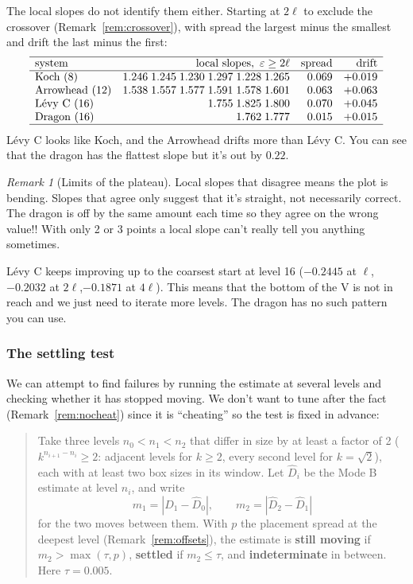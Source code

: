 \documentclass[11pt, a4paper]{article}
\theoremstyle{plain}
\theoremstyle{definition}
\theoremstyle{remark}
\newtheorem{remark}[theorem]{Remark}
\newcommand{\eps}{\varepsilon}
\begin{document}
The local slopes do not identify them either. Starting at $2\ell$ to exclude the crossover
(Remark~\ref{rem:crossover}), with spread the largest minus the smallest and drift the last minus the first:
\[
\begin{array}{lrrr}
\hline
\text{system} & \text{local slopes},\ \eps\geq2\ell & \text{spread} & \text{drift}\\
\hline
\text{Koch (8)}      & 1.246\;1.245\;1.230\;1.297\;1.228\;1.265 & 0.069 & +0.019\\
\text{Arrowhead (12)}& 1.538\;1.557\;1.577\;1.591\;1.578\;1.601 & 0.063 & +0.063\\
\text{L\'evy C (16)} & 1.755\;1.825\;1.800                      & 0.070 & +0.045\\
\text{Dragon (16)}   & 1.762\;1.777                             & 0.015 & +0.015\\
\hline
\end{array}
\]
L\'evy C looks like Koch, and the Arrowhead drifts more than L\'evy C.
You can see that the dragon has the flattest slope but it's out by $0.22$.

\begin{remark}[Limits of the plateau]
\label{rem:plateau-limits}
    Local slopes that disagree means the plot is bending. Slopes that agree only suggest that it's straight, not necessarily correct.
    The dragon is off by the same amount each time so they agree on the wrong value!! With only 2 or 3 points a local slope can't really tell you anything sometimes.
\end{remark}

\noindent  L\'evy C keeps improving up to the coarsest start at level 16 ($-0.2445$ at $\ell$, $-0.2032$ at $2\ell$,$-0.1871$ at $4\ell$).
This means that the bottom of the V is not in reach and we just need to iterate more levels. The dragon has no such pattern you can use.

\subsubsection{The settling test}
\label{sec:levels}

We can attempt to find failures by running the estimate at several levels and checking whether it has stopped moving. 
We don't want to tune after the fact (Remark~\ref{rem:nocheat}) since it is ``cheating'' so the test is fixed in advance:

\begin{quote}\small
Take three levels $n_0<n_1<n_2$ that differ in size by at least a factor of 2
($k^{n_{i+1}-n_i}\geq2$: adjacent levels for $k\geq2$, every second level for
$k=\sqrt2$), each with at least two box sizes in its window. Let $\hat D_i$ be
the Mode B estimate at level $n_i$, and write
\[
  m_1=|\hat D_1-\hat D_0|,\qquad m_2=|\hat D_2-\hat D_1|
\]
for the two moves between them. With $p$ the placement spread at the deepest
level (Remark~\ref{rem:offsets}), the estimate is \textbf{still moving} if
$m_2>\max(\tau,p)$, \textbf{settled} if $m_2\leq\tau$, and
\textbf{indeterminate} in between. Here $\tau=0.005$.
\end{quote}
\end{document}
